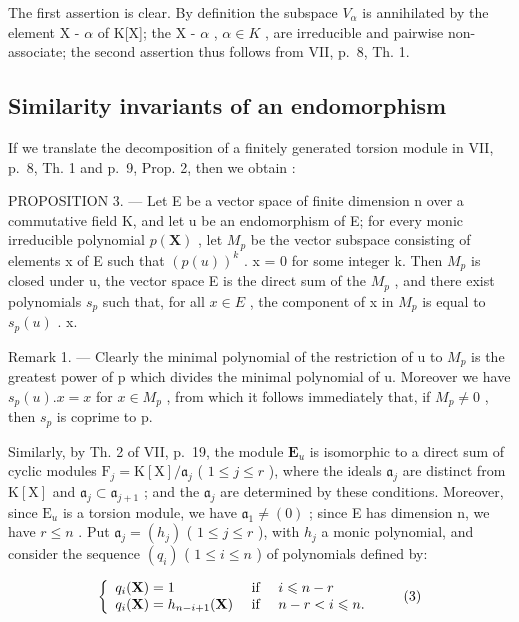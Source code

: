 The first assertion is clear. By definition the subspace \(V_{\alpha}\) is annihilated by the element X - \(\alpha\) of K{[}X{]}; the X - \(\alpha\) , \(\alpha \in K\) , are irreducible and pairwise non-associate; the second assertion thus follows from VII, p.~8, Th. 1.

\subsection{Similarity invariants of an endomorphism}

If we translate the decomposition of a finitely generated torsion module in VII, p.~8, Th. 1 and p.~9, Prop. 2, then we obtain :

PROPOSITION 3. --- Let E be a vector space of finite dimension n over a commutative field K, and let u be an endomorphism of E; for every monic irreducible polynomial \(p(\mathbf{X})\) , let \(M_{p}\) be the vector subspace consisting of elements x of E such that \((p(u))^{k}\) . x = 0 for some integer k. Then \(M_{p}\) is closed under u, the vector space E is the direct sum of the \(M_{p}\) , and there exist polynomials \(s_{p}\) such that, for all \(x \in E\) , the component of x in \(M_{p}\) is equal to \(s_{p}(u)\) . x.

Remark 1. --- Clearly the minimal polynomial of the restriction of u to \(M_{p}\) is the greatest power of p which divides the minimal polynomial of u. Moreover we have \(s_{p}(u).x = x\) for \(x \in M_{p}\) , from which it follows immediately that, if \(M_{p} \neq 0\) , then \(s_{p}\) is coprime to p.

Similarly, by Th. 2 of VII, p.~19, the module \(\mathbf{E}_u\) is isomorphic to a direct sum of cyclic modules \(\mathrm{F}_j = \mathrm{K}[\mathrm{X}] / \mathfrak{a}_j\) ( \(1 \leqslant j \leqslant r\) ), where the ideals \(\mathfrak{a}_j\) are distinct from \(\mathrm{K}[\mathrm{X}]\) and \(\mathfrak{a}_j \subset \mathfrak{a}_{j+1}\) ; and the \(\mathfrak{a}_j\) are determined by these conditions. Moreover, since \(\mathrm{E}_u\) is a torsion module, we have \(\mathfrak{a}_1 \neq (0)\) ; since E has dimension n, we have \(r \leqslant n\) . Put \(\mathfrak{a}_j = (h_j)\) ( \(1 \leqslant j \leqslant r\) ), with \(h_j\) a monic polynomial, and consider the sequence \((q_i)\) ( \(1 \leqslant i \leqslant n\) ) of polynomials defined by:

\[
\left\{ \begin{array}{l l} q _ {i} (\mathbf {X}) = 1 & \text { if } \quad i \leqslant n - r \\ q _ {i} (\mathbf {X}) = h _ {n - i + 1} (\mathbf {X}) & \text { if } \quad n - r <   i \leqslant n. \end{array} \right.\tag{3}
\]

